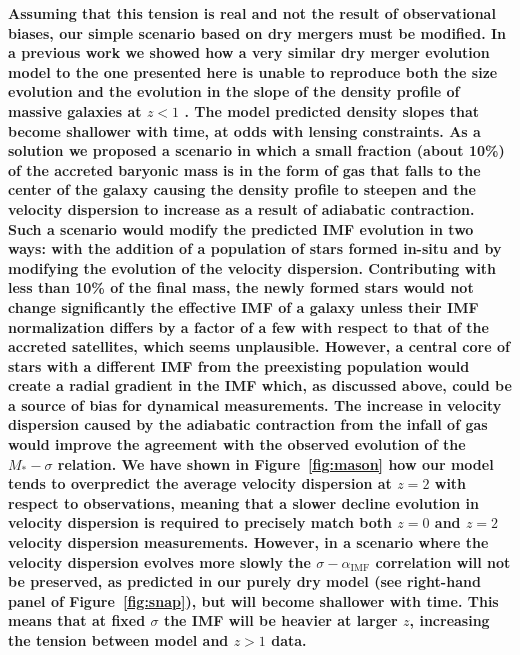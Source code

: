 \documentclass[usenatbib, letters]{mnras}
\def\aimf{\alpha_{\mathrm{IMF}}}
\def\Fref#1{Figure~\ref{#1}\xspace}
\begin{document}
{\bf
Assuming that this tension is real and not the result of observational biases, our simple scenario based on dry mergers must be modified.
In a previous work we showed how a very similar dry merger evolution model to the one presented here is unable to reproduce both the size evolution and the evolution in the slope of the density profile of massive galaxies at $z<1$ \citep{SNT14}.
The model predicted density slopes that become shallower with time, at odds with lensing constraints. As a solution we proposed a scenario in which a small fraction (about 10\%) of the accreted baryonic mass is in the form of gas that falls to the center of the galaxy causing the density profile to steepen and the velocity dispersion to increase as a result of adiabatic contraction. 
Such a scenario would modify the predicted IMF evolution in two ways: with the addition of a population of stars formed in-situ and by modifying the evolution of the velocity dispersion.
Contributing with less than 10\% of the final mass, the newly formed stars would not change significantly the effective IMF of a galaxy unless their IMF normalization differs by a factor of a few with respect to that of the accreted satellites, which seems unplausible. However, a central core of stars with a different IMF from the preexisting population would create a radial gradient in the IMF which, as discussed above, could be a source of bias for dynamical measurements.
The increase in velocity dispersion caused by the adiabatic contraction from the infall of gas would improve the agreement with the observed evolution of the $M_*-\sigma$ relation.
We have shown in \Fref{fig:mason} how our model tends to overpredict the average velocity dispersion at $z=2$ with respect to observations, meaning that a slower decline evolution in velocity dispersion is required to precisely match both $z=0$ and $z=2$ velocity dispersion measurements.
However, in a scenario where the velocity dispersion evolves more slowly the $\sigma-\aimf$ correlation will not be preserved, as predicted in our purely dry model (see right-hand panel of \Fref{fig:snap}), but will become shallower with time. This means that at fixed $\sigma$ the IMF will be heavier at larger $z$, increasing the tension between model and $z>1$ data.
}
\end{document}
